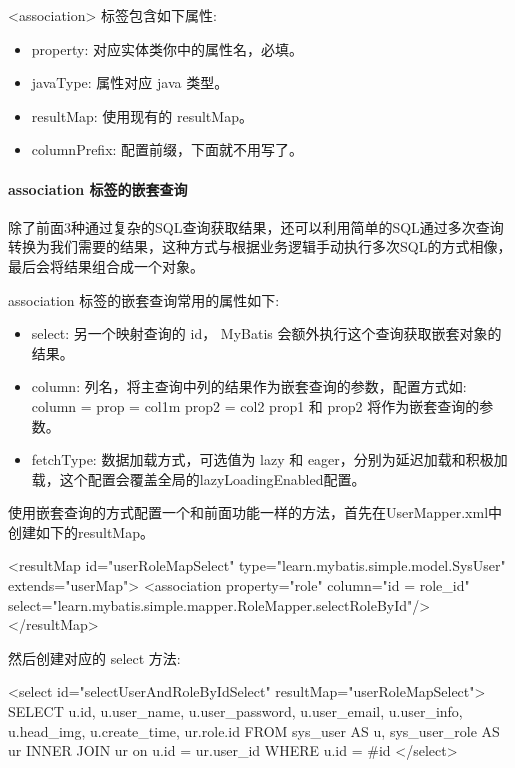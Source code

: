 <association> 标签包含如下属性:
\begin{itemize}
    \item property: 对应实体类你中的属性名，必填。
    \item javaType: 属性对应 java 类型。
    \item resultMap: 使用现有的 resultMap。
    \item columnPrefix: 配置前缀，下面就不用写了。
\end{itemize}

\paragraph*{association 标签的嵌套查询}

除了前面3种通过复杂的SQL查询获取结果，还可以利用简单的SQL通过多次查询转换为我们需要的结果，这种方式与根据业务逻辑手动执行多次SQL的方式相像，最后会将结果组合成一个对象。

association 标签的嵌套查询常用的属性如下:
\begin{itemize}
    \item select: 另一个映射查询的 id， MyBatis 会额外执行这个查询获取嵌套对象的结果。
    \item column: 列名，将主查询中列的结果作为嵌套查询的参数，配置方式如: column = {prop = col1m prop2 = col2} prop1 和 prop2 将作为嵌套查询的参数。
    \item fetchType: 数据加载方式，可选值为 lazy 和 eager，分别为延迟加载和积极加载，这个配置会覆盖全局的lazyLoadingEnabled配置。
\end{itemize}

使用嵌套查询的方式配置一个和前面功能一样的方法，首先在UserMapper.xml中创建如下的resultMap。

\begin{xml}
<resultMap id="userRoleMapSelect" type="learn.mybatis.simple.model.SysUser" extends="userMap">
    <association property="role" column="{id = role_id}" select="learn.mybatis.simple.mapper.RoleMapper.selectRoleById"/>
</resultMap>
\end{xml}

然后创建对应的 select 方法:

\begin{xml}
<select id="selectUserAndRoleByIdSelect" resultMap="userRoleMapSelect">
    SELECT u.id,
           u.user_name,
           u.user_password,
           u.user_email,
           u.user_info,
           u.head_img,
           u.create_time,
           ur.role.id
    FROM sys_user AS u,
         sys_user_role AS ur
             INNER JOIN ur on u.id = ur.user_id
    WHERE u.id = #{id}
</select>
\end{xml}